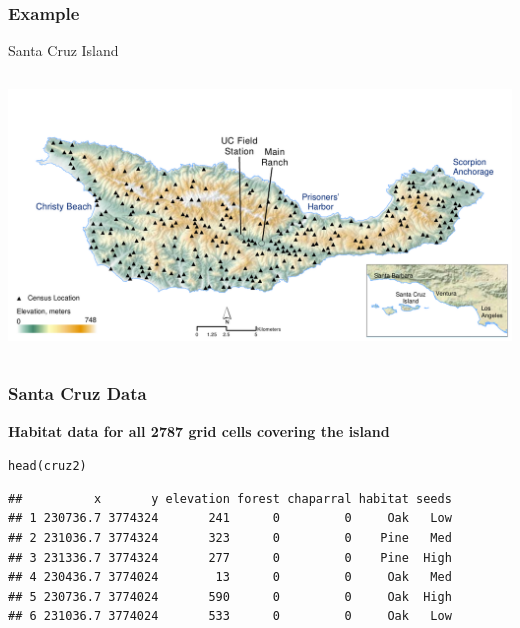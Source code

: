 \documentclass[color=usenames,dvipsnames]{beamer}\usepackage[]{graphicx}\usepackage[]{color}
\makeatletter
\newcommand{\hlstd}[1]{\textcolor[rgb]{0,0,0}{#1}}%
\newcommand{\hlkwd}[1]{\textcolor[rgb]{0.004,0.004,0.506}{#1}}%
\newenvironment{kframe}{%
 \def\at@end@of@kframe{}%
 \ifinner\ifhmode%
  \def\at@end@of@kframe{\end{minipage}}%
  \begin{minipage}{\columnwidth}%
 \fi\fi%
 \def\FrameCommand##1{\hskip\@totalleftmargin \hskip-\fboxsep
 \colorbox{shadecolor}{##1}\hskip-\fboxsep
     \hskip-\linewidth \hskip-\@totalleftmargin \hskip\columnwidth}%
 \MakeFramed {\advance\hsize-\width
   \@totalleftmargin\z@ \linewidth\hsize
   \@setminipage}}%
 {\par\unskip\endMakeFramed%
 \at@end@of@kframe}
\newenvironment{knitrout}{}{} %
\makeatother
\begin{document}
\begin{frame}[plain]
  \frametitle{Example}
  \Huge
  \centering
    Santa Cruz Island \\
  \begin{columns}
    \column{\dimexpr\paperwidth-20pt}
    \includegraphics[width=\textwidth]{figs/Santa-Cruz} \\
  \end{columns}
\end{frame}




\begin{frame}[fragile]
  \frametitle{Santa Cruz Data}
  \footnotesize


{\bf Habitat data for all 2787 grid cells covering the island}
\begin{knitrout}
\color{fgcolor}\begin{kframe}
\begin{alltt}
\hlkwd{head}\hlstd{(cruz2)}
\end{alltt}
\begin{verbatim}
##          x       y elevation forest chaparral habitat seeds
## 1 230736.7 3774324       241      0         0     Oak   Low
## 2 231036.7 3774324       323      0         0    Pine   Med
## 3 231336.7 3774324       277      0         0    Pine  High
## 4 230436.7 3774024        13      0         0     Oak   Med
## 5 230736.7 3774024       590      0         0     Oak  High
## 6 231036.7 3774024       533      0         0     Oak   Low
\end{verbatim}
\end{kframe}
\end{knitrout}
\end{frame}
\end{document}
